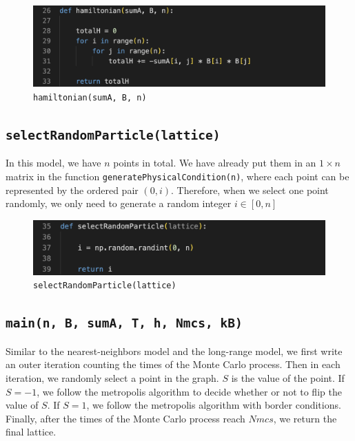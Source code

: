 \documentclass[11pt]{book}
\begin{document}
\begin{figure}
    \centering
    \includegraphics[width=1\linewidth]{rg_hamiltonian.png}
    \caption{\texttt{hamiltonian(sumA, B, n)}}
    \label{fig51}
\end{figure}

\subsection{\texttt{selectRandomParticle(lattice)}}
In this model, we have $n$ points in total. We have already put them in an $1 \times n$ matrix in the function \texttt{generatePhysicalCondition(n)}, where each point can be represented by the ordered pair $(0, i)$. Therefore, when we select one point randomly, we only need to generate a random integer $i \in [0, n]$

\begin{figure}
    \centering
    \includegraphics[width=1\linewidth]{rg_selectRandomParticle.png}
    \caption{\texttt{selectRandomParticle(lattice)}}
    \label{fig52}
\end{figure}

\subsection{\texttt{main(n, B, sumA, T, h, Nmcs, kB)}}
Similar to the nearest-neighbors model and the long-range model, we first write an outer iteration counting the times of the Monte Carlo process. Then in each iteration, we randomly select a point in the graph. $S$ is the value of the point. If $S = -1$, we follow the metropolis algorithm to decide whether or not to flip the value of $S$. If $S = 1$, we follow the metropolis algorithm with border conditions. Finally, after the times of the Monte Carlo process reach $Nmcs$, we return the final lattice.
\end{document}
